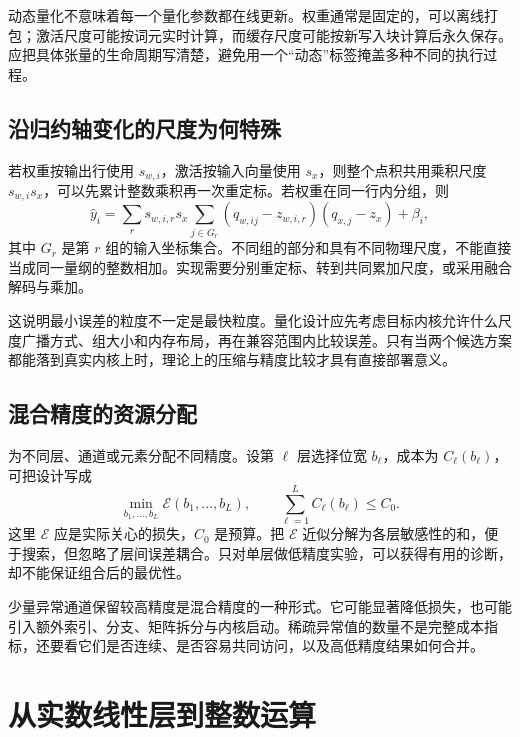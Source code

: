 \documentclass[UTF8,12pt,a4paper,fontset=fandol]{ctexart}
\begin{document}
动态量化不意味着每一个量化参数都在线更新。权重通常是固定的，可以离线打包；激活尺度可能按词元实时计算，而缓存尺度可能按新写入块计算后永久保存。应把具体张量的生命周期写清楚，避免用一个“动态”标签掩盖多种不同的执行过程。

\subsection{沿归约轴变化的尺度为何特殊}
若权重按输出行使用 $s_{w,i}$，激活按输入向量使用 $s_x$，则整个点积共用乘积尺度 $s_{w,i}s_x$，可以先累计整数乘积再一次重定标。若权重在同一行内分组，则
\begin{equation}
 \widehat y_i=\sum_r s_{w,i,r}s_x
 \sum_{j\in G_r}(q_{w,ij}-z_{w,i,r})(q_{x,j}-z_x)+\beta_i,
 \label{eq:quant-group-dot}
\end{equation}
其中 $G_r$ 是第 $r$ 组的输入坐标集合。不同组的部分和具有不同物理尺度，不能直接当成同一量纲的整数相加。实现需要分别重定标、转到共同累加尺度，或采用融合解码与乘加。

这说明最小误差的粒度不一定是最快粒度。量化设计应先考虑目标内核允许什么尺度广播方式、组大小和内存布局，再在兼容范围内比较误差。只有当两个候选方案都能落到真实内核上时，理论上的压缩与精度比较才具有直接部署意义。

\subsection{混合精度的资源分配}
为不同层、通道或元素分配不同精度。设第 $\ell$ 层选择位宽 $b_\ell$，成本为 $C_\ell(b_\ell)$，可把设计写成
\[
 \min_{b_1,\ldots,b_L}\mathcal E(b_1,\ldots,b_L),
 \qquad \sum_{\ell=1}^L C_\ell(b_\ell)\leq C_0.
\]
这里 $\mathcal E$ 应是实际关心的损失，$C_0$ 是预算。把 $\mathcal E$ 近似分解为各层敏感性的和，便于搜索，但忽略了层间误差耦合。只对单层做低精度实验，可以获得有用的诊断，却不能保证组合后的最优性。

少量异常通道保留较高精度是混合精度的一种形式。它可能显著降低损失，也可能引入额外索引、分支、矩阵拆分与内核启动。稀疏异常值的数量不是完整成本指标，还要看它们是否连续、是否容易共同访问，以及高低精度结果如何合并。

\section{从实数线性层到整数运算}
\label{sec:quant-integer}
\end{document}
